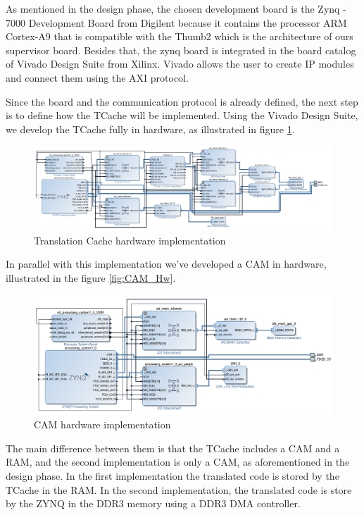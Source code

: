 As mentioned in the design phase, the chosen development board is the Zynq - 7000 Development Board from Digilent because it contains the processor ARM Cortex-A9 that is compatible with the Thumb2 which is the architecture of ours supervisor board. Besides that, the zynq board is integrated in the board catalog of Vivado Design Suite from Xilinx. Vivado allows the user to create IP modules and connect them using the AXI protocol.

Since the board and the communication protocol is already defined, the next step is to define how the TCache will be implemented. Using the Vivado Design Suite, we develop the TCache fully in hardware, as illustrated in figure \ref{fig:HwError1}. 

\begin{figure} [h!]
	\centering
	\includegraphics[scale = 0.45]{Images/HwError1.png}
	\caption{Translation Cache hardware implementation}
	\label{fig:HwError1}
\end{figure}

In parallel with this implementation we've developed a CAM in hardware, illustrated in the figure \ref{fig:CAM_Hw}.

\begin{figure} [H]
	\centering
	\includegraphics[scale = 0.45]{Images/CAM_Hw.png}
	\caption{CAM hardware implementation}
	\label{fig:CAM_HwImp}
\end{figure}

The main difference between them is that the TCache includes a CAM and a RAM, and the second implementation is only a CAM, as aforementioned in the design phase.
In the first implementation the translated code is stored by the TCache in the RAM. In the second implementation, the translated code is store by the ZYNQ in the DDR3 memory using a DDR3 DMA controller.

